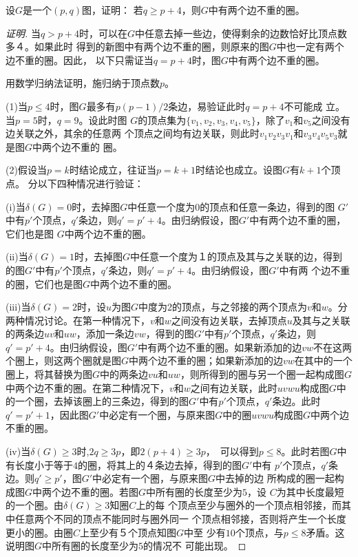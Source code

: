 \setcounter{Exercise}{0}
    \begin{Exercise}
    设$G$是一个$(p,q)$图，证明：
    若$q \geq p + 4$，则$G$中有两个边不重的圈。
  \end{Exercise}

  \begin{proof}[证明]
    当$q > p + 4$时，可以在$G$中任意去掉一些边，使得剩余的边数恰好比顶点数多４。如果此时
    得到的新图中有两个边不重的圈，则原来的图$G$中也一定有两个边不重的圈。因此，
    以下只需证当$q=p+4$时，图$G$中有两个边不重的圈。

    用数学归纳法证明，施归纳于顶点数$p$。

    (1)当$p \leq 4$时，图$G$最多有$p(p-1)/2$条边，易验证此时$q = p + 4$不可能成
    立。当$p = 5$时，$q = 9$。设此时图
    $G$的顶点集为$\{v_1,v_2,v_3,v_4,v_5\}$，除了$v_1$和$v_5$之间没有边关联之外，其余的任意两
    个顶点之间均有边关联，则此时$v_1v_2v_3v_1$和$v_3v_4v_5v_3$就是图$G$中两个边不重的
    圈。

       (2)假设当$p = k$时结论成立，往证当$p = k+1$时结论也成立。设图$G$有$k+1$个顶点。
    分以下四种情况进行验证：

    
    (i)当$\delta(G)=0$时，去掉图$G$中任意一个度为0的顶点和任意一条边，得到的图
    $G'$中有$p'$个顶点，$q'$条边，则$q'=p'+4$。由归纳假设，图$G'$中有两个边不重的圈，它们也是图
    $G$中两个边不重的圈。

    (ii)当$\delta(G)=1$时，去掉图$G$中任意一个度为１的顶点及其与之关联的边，得到
    的图$G'$中有$p'$个顶点，$q'$条边，则$q' = p' + 4$。由归纳假设，图$G'$中有两
    个边不重的圈，它们也是图$G$中两个边不重的圈。

     (iii)当$\delta(G)=2$时，设$u$为图$G$中度为2的顶点，与之邻接的两个顶点为$v$和$w$。分两种情况讨论。在第一种情况下，$v$和$w$之间没有边关联，去掉顶点$u$及其与之关联的两条边$uv$和$uw$，添加一条边$vw$，得到的图$G'$中有$p'$个顶点，$q'$条边，则$q'=p'+4$。由归纳假设，图$G'$中有两个边不重的圈。如果新添加的边$vw$不在这两个圈上，则这两个圈就是图$G$中两个边不重的圈；如果新添加的边$vw$在其中的一个圈上，将其替换为图$G$中的两条边$vu$和$uw$，则所得到的圈与另一个圈一起构成图$G$中两个边不重的圈。在第二种情况下，$v$和$w$之间有边关联，此时$uvwu$构成图$G$中的一个圈，去掉该圈上的三条边，得到的图$G'$中有$p'$个顶点，$q'$条边。此时$q'=p'+1$，因此图$G'$中必定有一个圈，与原来图$G$中的圈$uvwu$构成图$G$中两个边不重的圈。

         (iv)当$\delta(G)\geq 3$时,$2q\geq 3p$，即$2(p+4) \geq 3p$，　可以得到$p \leq
    8$。此时若图$G$中有长度小于等于$4$的圈，将其上的４条边去掉，得到的图$G'$中有
    $p'$个顶点，$q'$条边。则$q'\geq p'$，图$G'$中必定有一个圈，与原来图$G$中去掉的边
    所构成的圈一起构成图$G$中两个边不重的圈。若图$G$中所有圈的长度至少为$5$，设
    $C$为其中长度最短的一个圈。由$\delta(G)\geq 3$知圈$C$上的每
    个顶点至少与圈外的一个顶点相邻接，而其中任意两个不同的顶点不能同时与圈外同一
    个顶点相邻接，否则将产生一个长度更小的圈。由圈$C$上至少有５个顶点知图$G$中至
    少有$10$个顶点，与$p \leq 8$矛盾。这说明图$G$中所有圈的长度至少为$5$的情况不
    可能出现。


  \end{proof}
  

  \cite{Dijkstra} \cite{Shapley} \cite{Kruskal} \cite{Prim} 
  
  

      \chapter{}

      